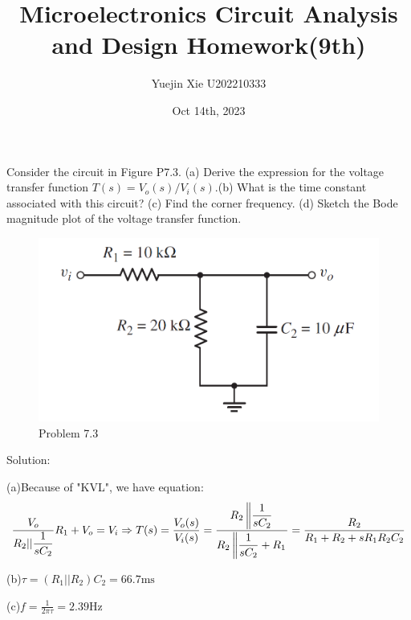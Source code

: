 \documentclass[a4paper,11pt,UTF8]{article}
\title{Microelectronics Circuit Analysis and Design Homework(9th)}
\author{Yuejin Xie \quad U202210333}
\date{Oct 14th, 2023}
\begin{document}
 Consider the circuit in Figure P7.3. (a) Derive the expression for the voltage transfer function $T(s) = V_o(s)/V_i (s)$.(b) What is the time constant associated with this circuit? (c) Find the corner frequency. (d) Sketch the Bode magnitude plot of the voltage transfer function.
\begin{figure}[H]
	\centering
	\includegraphics[scale=0.3]{MD7.3}
	\caption{Problem 7.3}
\end{figure}
Solution:

(a)Because of "KVL", we have equation:
$$
	\frac{V_o}{R_2||\displaystyle\frac1{sC_2}}R_1+V_o=V_i\\ \Rightarrow T(s)=\frac{V_o(s)}{V_i(s)}=\frac{R_{2}\left\|\displaystyle\frac{1}{sC_{2}}\right.}{R_{2}\left\|\displaystyle\frac{1}{sC_{2}}+R_{1}\right.}=\frac{R_{2}}{R_{1}+R_{2}+sR_{1}R_{2}C_{2}}
$$

(b)$\tau=(R_1||R_2)C_2=66.7\mathrm{ms}$

(c)$\displaystyle f=\frac{1}{2\pi\tau}=2.39\mathrm{Hz}$
\end{document}
